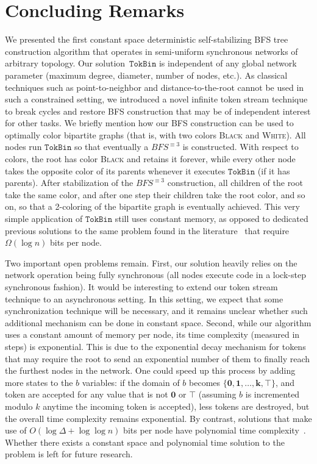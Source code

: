 \documentclass[a4paper, 12pt]{article}
\newcommand{\bz}{\mathbf{0}}
\newcommand{\bo}{\mathbf{1}}
\newcommand{\bk}{\mathbf{k}}
\begin{document}
\section{Concluding Remarks}

We presented the first constant space deterministic self-stabilizing BFS tree construction algorithm that operates in semi-uniform synchronous networks of arbitrary topology. Our solution~$\mathtt{TokBin}$ is independent of any global network parameter (maximum degree, diameter, number of nodes, etc.). As classical techniques such as point-to-neighbor and distance-to-the-root cannot be used in such a constrained setting, we introduced a novel infinite token stream technique to break cycles and restore BFS construction that may be of independent interest for other tasks. 
We briefly mention how our BFS construction can be used to optimally color bipartite graphs (that is, with two colors \textsc{Black} and \textsc{White}). All nodes run $\mathtt{TokBin}$ so that eventually a $BFS^{\equiv 3}$ is constructed. With respect to colors, the root has color \textsc{Black} and retains it forever, while every other node takes the opposite color of its parents whenever it executes $\mathtt{TokBin}$ (if it has parents). After stabilization of the $BFS^{\equiv 3}$ construction, all children of the root take the same color, and after one step their children take the root color, and so on, so that a 2-coloring of the bipartite graph is eventually achieved. This very simple application of $\mathtt{TokBin}$ still uses constant memory, as opposed to dedicated previous solutions to the same problem found in the literature~\cite{SS93,KK06} that require $\Omega(\log n)$ bits per node.


Two important open problems remain. 
First, our solution heavily relies on the network operation being fully synchronous (all nodes execute code in a lock-step synchronous fashion). It would be interesting to extend our token stream technique to an asynchronous setting. In this setting, we expect that some synchronization technique will be necessary, and it remains unclear whether such additional mechanism can be done in constant space. 
Second, while our algorithm uses a constant amount of memory per node, its time complexity (measured in steps) is exponential. 
This is due to the exponential decay mechanism for tokens that may require the root to send an exponential number of them to finally reach the furthest nodes in the network. One could speed up this process by adding more states to the $b$ variables: if the domain of $b$ becomes $\{\bz,\bo,\ldots,\bk,\top\}$, and token are accepted for any value that is not $\bz$ or $\top$ (assuming $b$ is incremented modulo $k$ anytime the incoming token is accepted), less tokens are destroyed, but the overall time complexity remains exponential. 
By contrast, solutions that make use of $O(\log \Delta + \log \log n)$ bits per node have polynomial time complexity~\cite{BT18}. Whether there exists a constant space and polynomial time solution to the problem is left for future research.


\end{document}
